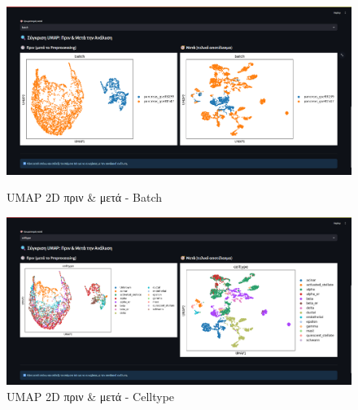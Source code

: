 \begin{figure}[!htb]
  \centering
  \begin{minipage}[t]{0.46\textwidth}
    \centering
    \includegraphics[width=\textwidth]{images/Analysis_Results2.png}
    \caption*{\small \foreignlanguage{english}{UMAP 2D} πριν \& μετά - \foreignlanguage{english}{Batch}}
  \end{minipage}
  \hfill
  \begin{minipage}[t]{0.46\textwidth}
    \centering
    \includegraphics[width=\textwidth]{images/Analysis_Results3.png}
    \caption*{\small \foreignlanguage{english}{UMAP 2D} πριν \& μετά - \foreignlanguage{english}{Celltype}}
  \end{minipage}
\end{figure}

